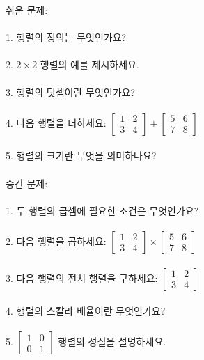 \documentclass[fleqn]{article}
\begin{document}
      
      쉬운 문제: \\\\
1. 행렬의 정의는 무엇인가요? \\\\
2. \(2 \times 2\) 행렬의 예를 제시하세요. \\\\
3. 행렬의 덧셈이란 무엇인가요? \\\\
4. 다음 행렬을 더하세요: \(\begin{bmatrix} 1 & 2 \\ 3 & 4 \end{bmatrix} + \begin{bmatrix} 5 & 6 \\ 7 & 8 \end{bmatrix}\) \\\\
5. 행렬의 크기란 무엇을 의미하나요? \\\\

중간 문제: \\\\
1. 두 행렬의 곱셈에 필요한 조건은 무엇인가요? \\\\
2. 다음 행렬을 곱하세요: \(\begin{bmatrix} 1 & 2 \\ 3 & 4 \end{bmatrix} \times \begin{bmatrix} 5 & 6 \\ 7 & 8 \end{bmatrix}\) \\\\
3. 다음 행렬의 전치 행렬을 구하세요: \(\begin{bmatrix} 1 & 2 \\ 3 & 4 \end{bmatrix}\) \\\\
4. 행렬의 스칼라 배율이란 무엇인가요? \\\\
5. \( \begin{bmatrix} 1 & 0 \\ 0 & 1 \end{bmatrix} \) 행렬의 성질을 설명하세요. \\\\
\end{document}
